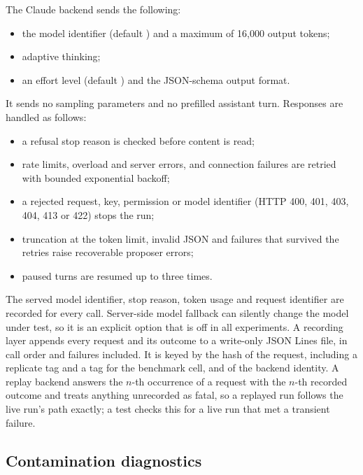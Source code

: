 The Claude backend sends the following:
\begin{itemize}
  \item the model identifier (default ) and a maximum of
    16{,}000 output tokens;
  \item adaptive thinking;
  \item an effort level (default ) and the JSON-schema output
    format.
\end{itemize}
It sends no sampling parameters and no prefilled assistant turn. Responses
are handled as follows:
\begin{itemize}
  \item a refusal stop reason is checked before content is read;
  \item rate limits, overload and server errors, and connection failures are
    retried with bounded exponential backoff;
  \item a rejected request, key, permission or model identifier (HTTP 400,
    401, 403, 404, 413 or 422) stops the run;
  \item truncation at the token limit, invalid JSON and failures that
    survived the retries raise recoverable proposer errors;
  \item paused turns are resumed up to three times.
\end{itemize}
The served model identifier, stop reason, token usage and request
identifier are recorded for every call. Server-side model fallback can
silently change the model under test, so it is an explicit option that is
off in all experiments. A recording layer appends every request and its
outcome to a write-only JSON Lines file, in call order and failures included.
It is keyed by the hash of the request, including a replicate tag and a tag
for the benchmark cell, and of the backend identity. A replay backend
answers the $n$-th occurrence of a request with the $n$-th recorded outcome
and treats anything unrecorded as fatal, so a replayed run follows the live
run's path exactly; a test checks this for a live run that met a transient
failure.

\subsection{Contamination diagnostics}
\label{sec:contamination}

